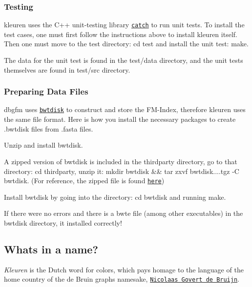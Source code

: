\subsubsection*{Testing}

{\ttfamily kleuren} uses the C++ unit-\/testing library \href{https://github.com/philsquared/Catch}{\tt catch} to run unit tests. To install the test cases, one must first follow the instructions above to install {\ttfamily kleuren} itself. Then one must move to the test directory\+: {\ttfamily cd test} and install the unit test\+: {\ttfamily make}.

The data for the unit test is found in the {\ttfamily test/data} directory, and the unit tests themselves are found in {\ttfamily test/src} directory.

\subsubsection*{Preparing Data Files}

{\ttfamily dbgfm} uses \href{http://people.unipmn.it/manzini/bwtdisk/}{\tt bwtdisk} to construct and store the F\+M-\/\+Index, therefore {\ttfamily kleuren} uses the same file format. Here is how you install the necessary packages to create .bwtdisk files from .fasta files.


\begin{DoxyEnumerate}
\item Unzip and install {\ttfamily bwtdisk}.
\begin{DoxyEnumerate}
\item A zipped version of {\ttfamily bwtdisk} is included in the {\ttfamily thirdparty} directory, go to that directory\+: {\ttfamily cd thirdparty}, unzip it\+: {\ttfamily mkdir bwtdisk \&\& tar zxvf bwtdisk....\+tgz -\/C bwtdisk}. (For reference, the zipped file is found \href{http://people.unipmn.it/manzini/bwtdisk/bwtdisk.0.9.0.tgz}{\tt here})
\item Install {\ttfamily bwtdisk} by going into the directory\+: {\ttfamily cd bwtdisk} and running {\ttfamily make}.
\item If there were no errors and there is a {\ttfamily bwte} file (among other executables) in the {\ttfamily bwtdisk} directory, it installed correctly!
\end{DoxyEnumerate}
\end{DoxyEnumerate}

\subsection*{What\textquotesingle{}s in a name?}

{\itshape Kleuren} is the Dutch word for colors, which pays homage to the language of the home country of the de Bruin graph\textquotesingle{}s namesake, \href{https://en.wikipedia.org/wiki/Nicolaas_Govert_de_Bruijn}{\tt Nicolaas Govert de Bruijn}. 